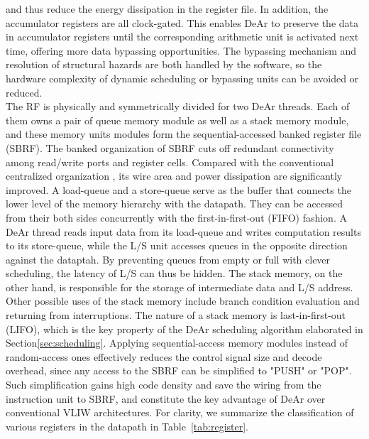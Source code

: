 and thus reduce the energy dissipation in the register file.
In addition, the accumulator registers are all clock-gated.
This enables DeAr to preserve the data in accumulator registers until the corresponding arithmetic unit is activated next time, 
offering more data bypassing opportunities.
The bypassing mechanism and resolution of structural hazards are both handled by the software, 
so the hardware complexity of dynamic scheduling or bypassing units can be avoided or reduced.
\\\indent
The RF is physically and symmetrically divided for two DeAr threads.
Each of them owns a pair of queue memory module as well as a stack memory module, 
and these memory units modules form the sequential-accessed banked register file (SBRF).
The banked organization of SBRF cuts off redundant connectivity among read/write ports and register cells.
Compared with the conventional centralized organization , 
its wire area and power dissipation are significantly improved.%
A load-queue and a store-queue serve as the buffer that connects the lower level of the memory hierarchy with the datapath.
They can be accessed from their both sides concurrently with the first-in-first-out (FIFO) fashion.
A DeAr thread reads input data from its load-queue and writes computation results to its store-queue, 
while the L/S unit accesses queues in the opposite direction against the dataptah.
By preventing queues from empty or full with clever scheduling, the latency of L/S can thus be hidden.
The stack memory, on the other hand, is responsible for the storage of intermediate data and L/S address.
Other possible uses of the stack memory include branch condition evaluation and returning from interruptions.
The nature of a stack memory is last-in-first-out (LIFO), 
which is the key property of the DeAr scheduling algorithm elaborated in Section\ref{sec:scheduling}.
Applying sequential-access memory modules instead of random-access ones effectively reduces the control signal size and decode overhead, 
since any access to the SBRF can be simplified to "PUSH" or "POP".
Such simplification gains high code density and save the wiring from the instruction unit to SBRF, 
and constitute the key advantage of DeAr over conventional VLIW architectures.
For clarity, we summarize the classification of various registers in the datapath in Table~\ref{tab:register}.

